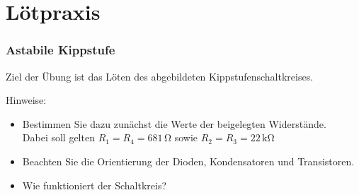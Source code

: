\documentclass[12pt]{article}
\begin{document}
\part*{Lötpraxis}

\section{Astabile Kippstufe}

Ziel der Übung ist das Löten des abgebildeten Kippstufenschaltkreises.

\noindent
\begin{minipage}{6in}
  \centering
  \hspace*{.2in}
\end{minipage}




Hinweise:
\begin{itemize}
\item Bestimmen Sie dazu zunächst die Werte der beigelegten Widerstände.\\ Dabei soll gelten $R_1 = R_4 = 681\,\mathrm{\Omega}$ sowie $R_2 = R_3 = 22\,\mathrm{k\Omega}$
\item Beachten Sie die Orientierung der Dioden, Kondensatoren und Transistoren.
\item Wie funktioniert der Schaltkreis?
\end{itemize}
\end{document}
